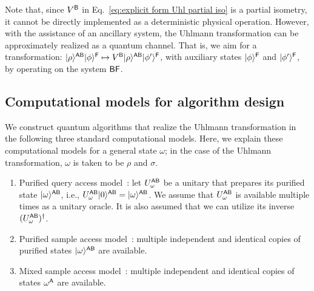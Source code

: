 Note that, since $V^{\mathsf{B}}$ in Eq.~\eqref{eq:explicit form Uhl partial iso} is a partial isometry, it cannot be directly implemented as a deterministic physical operation. However, with the assistance of an ancillary system, the Uhlmann transformation can be approximately realized as a quantum channel.
That is, we aim for a transformation: $|\rho\rangle^{{\mathsf{A}}{\mathsf{B}}}|\phi\rangle^{\mathsf{F}} \mapsto V^{\mathsf{B}}|\rho\rangle^{{\mathsf{A}}{\mathsf{B}}}|\phi'\rangle^{\mathsf{F}}$, with auxiliary states $|\phi\rangle^{\mathsf{F}}$ and $|\phi'\rangle^{\mathsf{F}}$, by operating on the system ${\mathsf{B}}{\mathsf{F}}$.











\subsection{Computational models for algorithm design}
\label{sec:three computational models}


We construct quantum algorithms that realize the Uhlmann transformation in the following three standard computational models. 
Here, we explain these computational models for a general state $\omega$; in the case of the Uhlmann transformation, $\omega$ is taken to be $\rho$ and $\sigma$.
\begin{enumerate}[label=\Roman*.]
    \item Purified query access model~\cite{watrous2002limitQSZK, watrous2009QSZKquantumattacks, belovs2019ClassicalDist, gilyen2019DistPropTesting, brandao2019SDPOpt, vanapeldoorn2019impleveSDP, Subramanian2021estimatealphalenni, gilyen2022improvedfidelity, Apeldoorn2023TomoPurifQuery, wang2023QAfidelityest, wang2023SampletoQuary, luo2024SuccinctTest, wang2024NewQuantEnt, Liu2024geometricmean}: let $U_\omega^{{\mathsf{A}}{\mathsf{B}}}$ be a unitary that prepares its purified state $|\omega\rangle^{{\mathsf{A}}{\mathsf{B}}}$, i.e., $U_\omega^{{\mathsf{A}}{\mathsf{B}}}|0\rangle^{{\mathsf{A}}{\mathsf{B}}}=|\omega\rangle^{{\mathsf{A}}{\mathsf{B}}}$.
    We assume that $U_\omega^{{\mathsf{A}}{\mathsf{B}}}$ is available multiple times as a unitary oracle.
    It is also assumed that we can utilize its inverse $(U_\omega^{{\mathsf{A}}{\mathsf{B}}})^\dag$.
    \item Purified sample access model~\cite{chen2024localtestUniInv, liu2024exponentialseparations}:
    multiple independent and identical copies of purified states $|\omega\rangle^{{\mathsf{A}}{\mathsf{B}}}$ are available.
    \item Mixed sample access model~\cite{gilyen2022improvedfidelity, wang2023SampletoQuary, wang2024TimeEfficientEntEstSamp, wang2024sampleoptimal}: multiple independent and identical copies of states $\omega^{\mathsf{A}}$ are available.
\end{enumerate}




